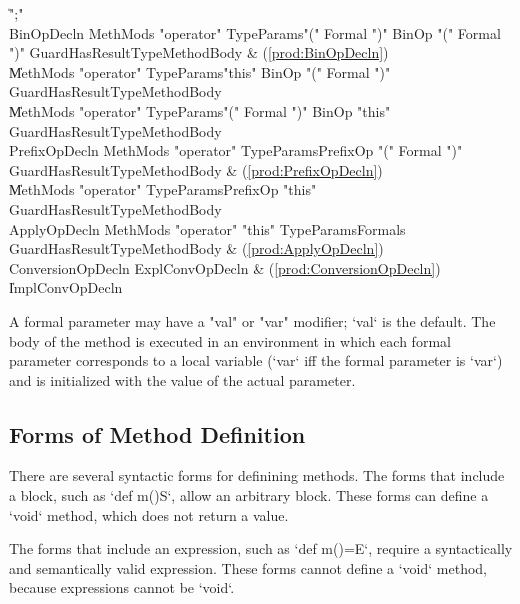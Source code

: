 \begin{bbgrammar}
                     \| \xcd";" \\
          BinOpDecln \: MethMods \xcd"operator" TypeParams\opt \xcd"(" Formal  \xcd")" BinOp \xcd"(" Formal  \xcd")" Guard\opt HasResultType\opt MethodBody & (\ref{prod:BinOpDecln}) \\
                     \| MethMods \xcd"operator" TypeParams\opt \xcd"this" BinOp \xcd"(" Formal  \xcd")" Guard\opt HasResultType\opt MethodBody \\
                     \| MethMods \xcd"operator" TypeParams\opt \xcd"(" Formal  \xcd")" BinOp \xcd"this" Guard\opt HasResultType\opt MethodBody \\
       PrefixOpDecln \: MethMods \xcd"operator" TypeParams\opt PrefixOp \xcd"(" Formal  \xcd")" Guard\opt HasResultType\opt MethodBody & (\ref{prod:PrefixOpDecln}) \\
                     \| MethMods \xcd"operator" TypeParams\opt PrefixOp \xcd"this" Guard\opt HasResultType\opt MethodBody \\
        ApplyOpDecln \: MethMods \xcd"operator" \xcd"this" TypeParams\opt Formals Guard\opt HasResultType\opt MethodBody & (\ref{prod:ApplyOpDecln}) \\
   ConversionOpDecln \: ExplConvOpDecln & (\ref{prod:ConversionOpDecln}) \\
                     \| ImplConvOpDecln \\
\end{bbgrammar}


A formal parameter may have a \xcd"val" or \xcd"var"
modifier; \xcd`val` is the default.
The body of the method is executed in an environment in which 
each formal parameter corresponds to a local variable (\xcd`var` iff the
formal parameter is \xcd`var`)
and is initialized with the value of the actual parameter.

\subsection{Forms of Method Definition}

There are several syntactic forms for definining methods.   The forms that
include a block, such as \xcd`def m(){S}`, allow an arbitrary block.  These
forms can define a \xcd`void` method, which does not return a value. 

The
forms that include an expression, such as \xcd`def m()=E`, require a
syntactically and semantically valid expression.   These forms cannot define a
\xcd`void` method, because expressions cannot be \xcd`void`.  


